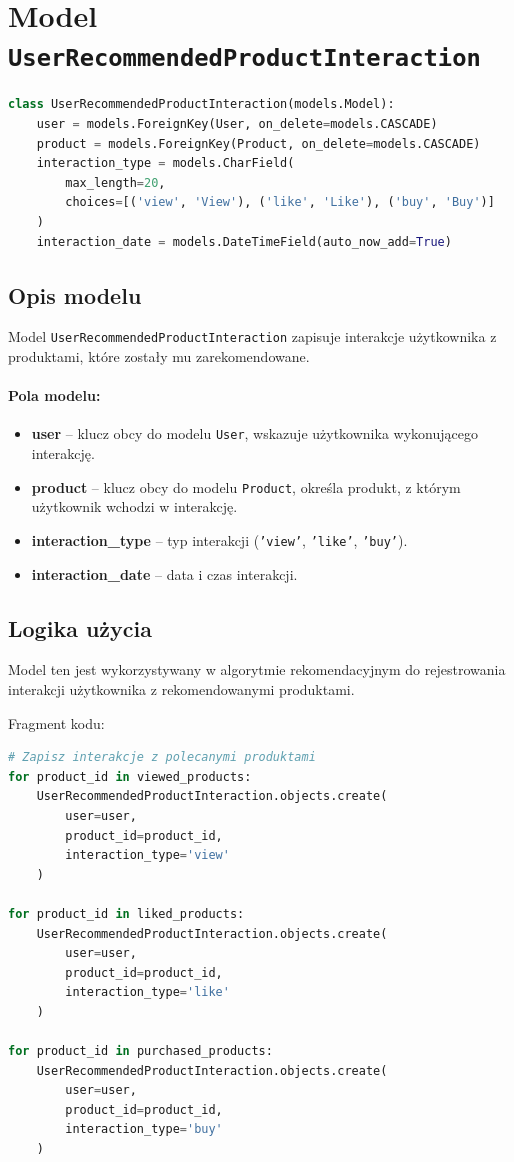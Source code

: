 \documentclass[12pt,a4paper,oneside]{article}
\theoremstyle{definition}
\numberwithin{equation}{section}
\begin{document}
\section{Model \texttt{UserRecommendedProductInteraction}}

\begin{lstlisting}[language=Python]
class UserRecommendedProductInteraction(models.Model):
    user = models.ForeignKey(User, on_delete=models.CASCADE)
    product = models.ForeignKey(Product, on_delete=models.CASCADE)
    interaction_type = models.CharField(
        max_length=20,
        choices=[('view', 'View'), ('like', 'Like'), ('buy', 'Buy')]
    )
    interaction_date = models.DateTimeField(auto_now_add=True)
\end{lstlisting}

\subsection*{Opis modelu}
Model \texttt{UserRecommendedProductInteraction} zapisuje interakcje użytkownika z produktami, które zostały mu zarekomendowane. 

\paragraph{Pola modelu:}
\begin{itemize}
    \item \textbf{user} -- klucz obcy do modelu \texttt{User}, wskazuje użytkownika wykonującego interakcję.
    \item \textbf{product} -- klucz obcy do modelu \texttt{Product}, określa produkt, z którym użytkownik wchodzi w interakcję.
    \item \textbf{interaction\_type} -- typ interakcji (\texttt{'view'}, \texttt{'like'}, \texttt{'buy'}).
    \item \textbf{interaction\_date} -- data i czas interakcji.
\end{itemize}

\subsection*{Logika użycia}
Model ten jest wykorzystywany w algorytmie rekomendacyjnym do rejestrowania interakcji użytkownika z rekomendowanymi produktami.

Fragment kodu:

\begin{lstlisting}[language=Python]
# Zapisz interakcje z polecanymi produktami
for product_id in viewed_products:
    UserRecommendedProductInteraction.objects.create(
        user=user,
        product_id=product_id,
        interaction_type='view'
    )

for product_id in liked_products:
    UserRecommendedProductInteraction.objects.create(
        user=user,
        product_id=product_id,
        interaction_type='like'
    )

for product_id in purchased_products:
    UserRecommendedProductInteraction.objects.create(
        user=user,
        product_id=product_id,
        interaction_type='buy'
    )
\end{lstlisting}
\end{document}
